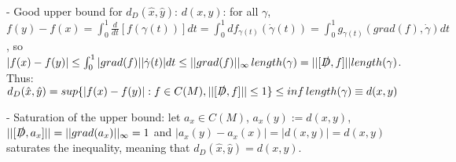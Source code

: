 {        - Good upper bound for $d_D(\hat x, \hat y)$: $d(x, y)$: for all $\gamma$, $f(y) - f(x) = \int_0^1 \frac{d}{dt}[f(\gamma(t))]dt = \int_0^1 df_{\gamma(t)} (\dot \gamma(t)) = \int_0^1 g_{\gamma(t)}(grad(f), \dot \gamma) dt$, 
        so
        $|f(x) - f(y)| \leq \int_0^1 |grad(f)| |\dot \gamma(t)| dt \leq ||grad(f)||_
        \infty \, length(\gamma) = ||[\slashed D, f]|| length(\gamma)$. 
        Thus:
        $d_D(\hat x, \hat y) = sup\{|f(x) - f(y)|: f \in C(M), ||[\slashed D, f]||\leq 1\} \leq inf \, length(\gamma) \equiv d(x, y)$
        
        - Saturation of the upper bound: let $a_x \in C(M)$, $a_x(y) := d(x, y)$, %
        $||[\slashed D, a_x]|| = ||grad(a_x)||_\infty = 1$ and $|a_x(y) - a_x(x)| = |d(x,y)| = d(x,y)$ saturates the inequality, meaning that $ d_D(\hat x, \hat y) = d(x, y)$.
}

\linea